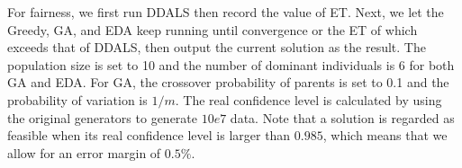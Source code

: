 \documentclass[lettersize,journal]{IEEEtran}
\begin{document}
For fairness, we first run DDALS then record the value of ET. 
Next, we let the Greedy, GA, and EDA keep running until convergence or the ET of which exceeds that of DDALS, then output the current solution as the result. 
The population size is set to 10 and the number of dominant individuals is 6 for both GA and EDA. 
For GA, the crossover probability of parents is set to 0.1 and the probability of variation is $1/m$. 
The real confidence level is calculated by using the original generators to generate $10e7$ data. 
Note that a solution is regarded as feasible when its real confidence level is larger than $0.985$, which means that we allow for an error margin of $0.5\%$.
\end{document}
